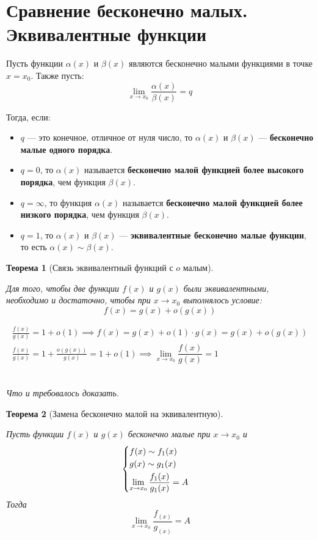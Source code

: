 \documentclass[a4paper,12pt,oneside]{extbook}
\newcommand{\newpar}{$ $\par\nobreak\ignorespaces}
\theoremstyle{numbered}
\theoremstyle{unnumbered}
\theoremstyle{named}
\newtheorem{theorem}{Теорема}[section]
\theoremstyle{unnumbered}
\theoremstyle{named}
\theoremstyle{named}
\theoremstyle{named}
\renewenvironment{proof}[1][]{\breakenv[Доказательство]{\if\relax\detokenize{#1}\relax\else\;\fi}{\textbf{#1}}}{\smallskip\newpar \hfill\textit{Что и требовалось доказать.}}
\begin{document}
\section{Сравнение бесконечно малых. Эквивалентные функции}%
\label{sec:Сравнение бесконечно малых. Эквивалентные функции}

\begin{siderules}
    Пусть функции \(\alpha(x)\) и \(\beta(x)\) являются бесконечно малыми функциями в точке \(x = x_0\). Также пусть:
    \[
        \lim_{x \to x_0}{\dfrac{\alpha(x)}{\beta(x)}} = q
    \]

    Тогда, если:
    \begin{itemize}
        \item {\(q\) — это конечное, отличное от нуля число, то \(\alpha(x)\) и \(\beta(x)\) — \textbf{бесконечно малые одного порядка}.}
        \item {\(q = 0\), то \(\alpha(x)\) называется \textbf{бесконечно малой функцией более высокого порядка}, чем функция \(\beta(x)\).}
        \item {\(q = \infty\), то функция \(\alpha(x)\) называется \textbf{бесконечно малой функцией более низкого порядка}, чем функция \(\beta(x)\).}
        \item {\(q = 1\), то \(\alpha(x)\) и \(\beta(x)\) — \textbf{эквивалентные бесконечно малые функции}, то есть \(\alpha(x) \sim \beta(x)\).}
    \end{itemize}
\end{siderules}

\begin{theorem}[Связь эквивалентный функций с \(o\) малым]
    \newpar
    Для того, чтобы две функции \(f(x)\) и \(g(x)\) были эквивалентными, необходимо и достаточно, чтобы при \(x \to x_0\) выполнялось условие:
    \[
        f(x) = g(x) + o(g(x))
    \]
\end{theorem}

\begin{proof}
    \begin{gather*}
        \frac{f(x)}{g(x)} = 1 + o(1) \implies f(x) = g(x) + o(1) \cdot g(x) = g(x) + o(g(x)) \\
        \frac{f(x)}{g(x)} = 1 + \frac{o(g(x))}{g(x)} = 1 + o(1) \implies \lim_{x \to x_0}{\dfrac{f(x)}{g(x)}} = 1
    \end{gather*}
\end{proof}

\begin{theorem}[Замена бесконечно малой на эквивалентную]
    \newpar
    Пусть функции \(f(x)\) и \(g(x)\) бесконечно малые при \(x \to x_0\) и
    \[
        \begin{cases}
            f(x) \sim f_1(x) \\
            \smallskip
            g(x) \sim g_1(x) \\
            \displaystyle \lim_{x \to x_0}{\dfrac{f_1(x)}{g_1(x)}} = A
        \end{cases}
    \]
    Тогда
    \[
        \lim_{x \to x_0}{\dfrac{f_(x)}{g_(x)}} = A
    \]
\end{theorem}
\end{document}
